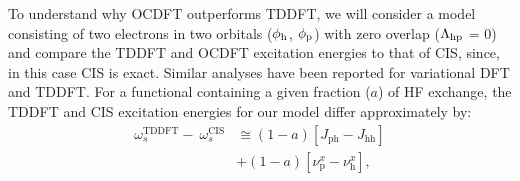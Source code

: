 \documentclass[12pt]{article}
\begin{document}
To understand why OCDFT outperforms TDDFT, we will consider a model consisting of two electrons in two orbitals ($\phi_{\rm h}$, $\phi_{\rm p}$) with zero overlap ($\Lambda_{\rm hp}$ = 0) and compare the TDDFT and OCDFT excitation energies to that of CIS, since, in this case CIS is exact. Similar analyses have been reported for variational DFT \cite{ziegler_implementation_2012} and TDDFT. \cite{casida_charge-transfer_2000} For a functional containing a given fraction ($a$) of HF exchange, the TDDFT and CIS excitation energies for our model differ approximately by:
\begin{align}
\label{eq:TDDFT_CIS}
 \nonumber \omega^{\text{TDDFT}}_s - \ \omega^{\text{CIS}}_s &\cong (1 - a) [J_{\text{ph}} - J_{\text{hh}}] \\ &+ (1 - a) [\nu_{\text{p}}^x - \nu_{\text{h}}^x] ,
\end{align}
\end{document}
